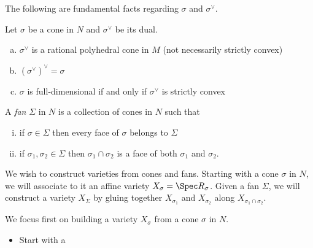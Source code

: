 The following are fundamental facts regarding $\sigma$ and $\sigma^{\vee}$.
\begin{prop}\label{prop:facts-about-cones-and-duals}
	Let $\sigma$ be a cone in $N$ and $\sigma^{\vee}$ be its dual.
	\begin{enumerate}[(a)]
		\item $\sigma^{\vee}$ is a rational polyhedral cone in $M$ (not necessarily strictly convex)
		\item $(\sigma^{\vee})^{\vee} = \sigma$
		\item $\sigma$ is full-dimensional if and only if $\sigma^{\vee}$ is strictly convex
	\end{enumerate}
\end{prop}
\begin{defn}\label{defn:fan}
	A \emph{fan} $\Sigma$ in $N$ is a collection of cones in $N$ such that
	\begin{enumerate}[(i)]
		\item if $\sigma \in \Sigma$ then every face of $\sigma$ belongs to $\Sigma$ 
		\item if $\sigma_1,\sigma_2\in \Sigma$ then $\sigma_1\cap \sigma_2$ is a face of both $\sigma_1$ and $\sigma_2$.
	\end{enumerate}
\end{defn}
We wish to construct varieties from cones and fans. Starting with a cone $\sigma$ in $N$, we will associate to it an affine variety $X_\sigma = \Spec R_\sigma$. Given a fan $\Sigma$, we will construct a variety $X_\Sigma$ by gluing together $X_{\sigma_1}$ and $X_{\sigma_2}$ along $X_{\sigma_1 \cap \sigma_2}$.

We focus first on building a variety $X_\sigma$ from a cone $\sigma$ in $N$. 
\begin{itemize}
	\item Start with a 
\end{itemize}

